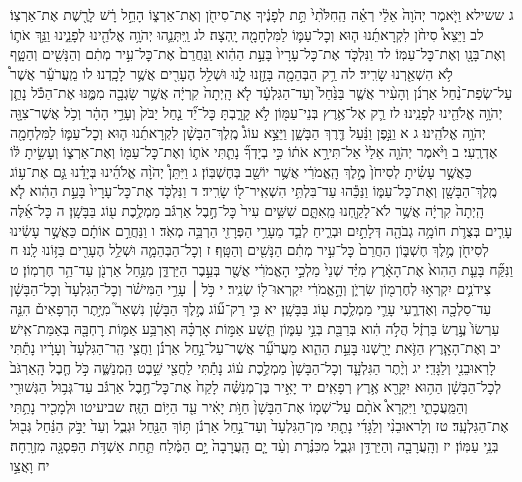 \documentclass[twoside, openany, parskip=half, 11pt]{book}
\begin{document}
ג ששילא וַיֹּ֤אמֶר יְהֹוָה֙ אֵלַ֔י רְאֵ֗ה הַֽחִלֹּ֙תִי֙ תֵּ֣ת לְפָנֶ֔יךָ אֶת־סִיחֹ֖ן וְאֶת־אַרְצ֑וֹ הָחֵ֣ל רָ֔שׁ לָרֶ֖שֶׁת אֶת־אַרְצֽוֹ׃ לב וַיֵּצֵא֩ סִיחֹ֨ן לִקְרָאתֵ֜נוּ ה֧וּא וְכׇל־עַמּ֛וֹ לַמִּלְחָמָ֖ה יָֽהְצָה׃ לג וַֽיִּתְּנֵ֛הוּ יְהֹוָ֥ה אֱלֹהֵ֖ינוּ לְפָנֵ֑ינוּ וַנַּ֥ךְ אֹת֛וֹ וְאֶת־בָּנָ֖ו וְאֶת־כׇּל־עַמּֽוֹ׃ לד וַנִּלְכֹּ֤ד אֶת־כׇּל־עָרָיו֙ בָּעֵ֣ת הַהִ֔וא וַֽנַּחֲרֵם֙ אֶת־כׇּל־עִ֣יר מְתִ֔ם וְהַנָּשִׁ֖ים וְהַטָּ֑ף לֹ֥א הִשְׁאַ֖רְנוּ שָׂרִֽיד׃ לה רַ֥ק הַבְּהֵמָ֖ה בָּזַ֣זְנוּ לָ֑נוּ וּשְׁלַ֥ל הֶעָרִ֖ים אֲשֶׁ֥ר לָכָֽדְנוּ׃ לו מֵֽעֲרֹעֵ֡ר אֲשֶׁר֩ עַל־שְׂפַת־נַ֨חַל אַרְנֹ֜ן וְהָעִ֨יר אֲשֶׁ֤ר בַּנַּ֙חַל֙ וְעַד־הַגִּלְעָ֔ד לֹ֤א הָֽיְתָה֙ קִרְיָ֔ה אֲשֶׁ֥ר שָׂגְבָ֖ה מִמֶּ֑נּוּ אֶת־הַכֹּ֕ל נָתַ֛ן יְהֹוָ֥ה אֱלֹהֵ֖ינוּ לְפָנֵֽינוּ׃ לז רַ֛ק אֶל־אֶ֥רֶץ בְּנֵי־עַמּ֖וֹן לֹ֣א קָרָ֑בְתָּ כׇּל־יַ֞ד נַ֤חַל יַבֹּק֙ וְעָרֵ֣י הָהָ֔ר וְכֹ֥ל אֲשֶׁר־צִוָּ֖ה יְהֹוָ֥ה אֱלֹהֵֽינוּ׃ ג א וַנֵּ֣פֶן וַנַּ֔עַל דֶּ֖רֶךְ הַבָּשָׁ֑ן וַיֵּצֵ֣א עוֹג֩ מֶֽלֶךְ־הַבָּשָׁ֨ן לִקְרָאתֵ֜נוּ ה֧וּא וְכׇל־עַמּ֛וֹ לַמִּלְחָמָ֖ה אֶדְרֶֽעִי׃ ב וַיֹּ֨אמֶר יְהֹוָ֤ה אֵלַי֙ אַל־תִּירָ֣א אֹת֔וֹ כִּ֣י בְיָדְךָ֞ נָתַ֧תִּי אֹת֛וֹ וְאֶת־כׇּל־עַמּ֖וֹ וְאֶת־אַרְצ֑וֹ וְעָשִׂ֣יתָ לּ֔וֹ כַּאֲשֶׁ֣ר עָשִׂ֗יתָ לְסִיחֹן֙ מֶ֣לֶךְ הָֽאֱמֹרִ֔י אֲשֶׁ֥ר יוֹשֵׁ֖ב בְּחֶשְׁבּֽוֹן׃ ג וַיִּתֵּן֩ יְהֹוָ֨ה אֱלֹהֵ֜ינוּ בְּיָדֵ֗נוּ גַּ֛ם אֶת־ע֥וֹג מֶֽלֶךְ־הַבָּשָׁ֖ן וְאֶת־כׇּל־עַמּ֑וֹ וַנַּכֵּ֕הוּ עַד־בִּלְתִּ֥י הִשְׁאִֽיר־ל֖וֹ שָׂרִֽיד׃ ד וַנִּלְכֹּ֤ד אֶת־כׇּל־עָרָיו֙ בָּעֵ֣ת הַהִ֔וא לֹ֤א הָֽיְתָה֙ קִרְיָ֔ה אֲשֶׁ֥ר לֹא־לָקַ֖חְנוּ מֵֽאִתָּ֑ם שִׁשִּׁ֥ים עִיר֙ כׇּל־חֶ֣בֶל אַרְגֹּ֔ב מַמְלֶ֥כֶת ע֖וֹג בַּבָּשָֽׁן׃ ה כׇּל־אֵ֜לֶּה עָרִ֧ים בְּצֻרֹ֛ת חוֹמָ֥ה גְבֹהָ֖ה דְּלָתַ֣יִם וּבְרִ֑יחַ לְבַ֛ד מֵעָרֵ֥י הַפְּרָזִ֖י הַרְבֵּ֥ה מְאֹֽד׃ ו וַנַּחֲרֵ֣ם אוֹתָ֔ם כַּאֲשֶׁ֣ר עָשִׂ֔ינוּ לְסִיחֹ֖ן מֶ֣לֶךְ חֶשְׁבּ֑וֹן הַחֲרֵם֙ כׇּל־עִ֣יר מְתִ֔ם הַנָּשִׁ֖ים וְהַטָּֽף׃ ז וְכׇל־הַבְּהֵמָ֛ה וּשְׁלַ֥ל הֶעָרִ֖ים בַּזּ֥וֹנוּ לָֽנוּ׃ ח וַנִּקַּ֞ח בָּעֵ֤ת הַהִוא֙ אֶת־הָאָ֔רֶץ מִיַּ֗ד שְׁנֵי֙ מַלְכֵ֣י הָאֱמֹרִ֔י אֲשֶׁ֖ר בְּעֵ֣בֶר הַיַּרְדֵּ֑ן מִנַּ֥חַל אַרְנֹ֖ן עַד־הַ֥ר חֶרְמֽוֹן׃ ט צִידֹנִ֛ים יִקְרְא֥וּ לְחֶרְמ֖וֹן שִׂרְיֹ֑ן וְהָ֣אֱמֹרִ֔י יִקְרְאוּ־ל֖וֹ שְׂנִֽיר׃ י כֹּ֣ל ׀ עָרֵ֣י הַמִּישֹׁ֗ר וְכׇל־הַגִּלְעָד֙ וְכׇל־הַבָּשָׁ֔ן עַד־סַלְכָ֖ה וְאֶדְרֶ֑עִי עָרֵ֛י מַמְלֶ֥כֶת ע֖וֹג בַּבָּשָֽׁן׃ יא כִּ֣י רַק־ע֞וֹג מֶ֣לֶךְ הַבָּשָׁ֗ן נִשְׁאַר֮ מִיֶּ֣תֶר הָרְפָאִים֒ הִנֵּ֤ה עַרְשׂוֹ֙ עֶ֣רֶשׂ בַּרְזֶ֔ל הֲלֹ֣ה הִ֔וא בְּרַבַּ֖ת בְּנֵ֣י עַמּ֑וֹן תֵּ֧שַׁע אַמּ֣וֹת אׇרְכָּ֗הּ וְאַרְבַּ֥ע אַמּ֛וֹת רׇחְבָּ֖הּ בְּאַמַּת־אִֽישׁ׃ יב וְאֶת־הָאָ֧רֶץ הַזֹּ֛את יָרַ֖שְׁנוּ בָּעֵ֣ת הַהִ֑וא מֵעֲרֹעֵ֞ר אֲשֶׁר־עַל־נַ֣חַל אַרְנֹ֗ן וַחֲצִ֤י הַֽר־הַגִּלְעָד֙ וְעָרָ֔יו נָתַ֕תִּי לָרֽאוּבֵנִ֖י וְלַגָּדִֽי׃ יג וְיֶ֨תֶר הַגִּלְעָ֤ד וְכׇל־הַבָּשָׁן֙ מַמְלֶ֣כֶת ע֔וֹג נָתַ֕תִּי לַחֲצִ֖י שֵׁ֣בֶט הַֽמְנַשֶּׁ֑ה כֹּ֣ל חֶ֤בֶל הָֽאַרְגֹּב֙ לְכׇל־הַבָּשָׁ֔ן הַה֥וּא יִקָּרֵ֖א אֶ֥רֶץ רְפָאִֽים׃ יד יָאִ֣יר בֶּן־מְנַשֶּׁ֗ה לָקַח֙ אֶת־כׇּל־חֶ֣בֶל אַרְגֹּ֔ב עַד־גְּב֥וּל הַגְּשׁוּרִ֖י וְהַמַּֽעֲכָתִ֑י וַיִּקְרָא֩ אֹתָ֨ם עַל־שְׁמ֤וֹ אֶת־הַבָּשָׁן֙ חַוֺּ֣ת יָאִ֔יר עַ֖ד הַיּ֥וֹם הַזֶּֽה׃ שביעיטו וּלְמָכִ֖יר נָתַ֥תִּי אֶת־הַגִּלְעָֽד׃ טז וְלָראוּבֵנִ֨י וְלַגָּדִ֜י נָתַ֤תִּי מִן־הַגִּלְעָד֙ וְעַד־נַ֣חַל אַרְנֹ֔ן תּ֥וֹךְ הַנַּ֖חַל וּגְבֻ֑ל וְעַד֙ יַבֹּ֣ק הַנַּ֔חַל גְּב֖וּל בְּנֵ֥י עַמּֽוֹן׃ יז וְהָֽעֲרָבָ֖ה וְהַיַּרְדֵּ֣ן וּגְבֻ֑ל מִכִּנֶּ֗רֶת וְעַ֨ד יָ֤ם הָֽעֲרָבָה֙ יָ֣ם הַמֶּ֔לַח תַּ֛חַת אַשְׁדֹּ֥ת הַפִּסְגָּ֖ה מִזְרָֽחָה׃ יח וָאֲצַ֣ו 
\end{document}
